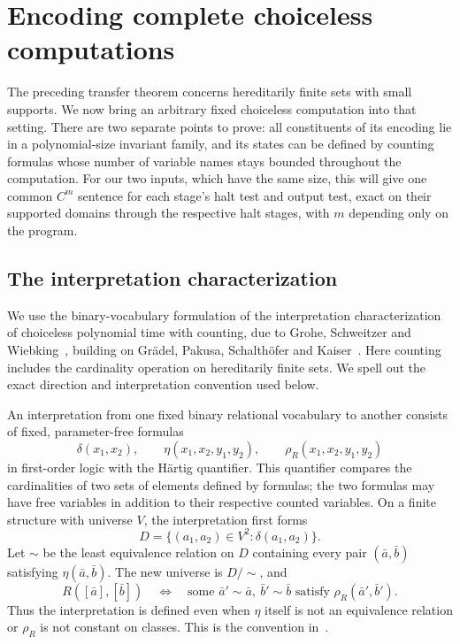 \section{Encoding complete choiceless computations}
\label{sec:coding}

The preceding transfer theorem concerns hereditarily finite sets with small
supports. We now bring an arbitrary fixed choiceless computation into that
setting. There are two separate points to prove: all constituents of its
encoding lie in a polynomial-size invariant family, and its states can be
defined by counting formulas whose number of variable names stays bounded
throughout the computation. For our two inputs, which have the same size,
this will give one common $C^m$ sentence for each stage's halt test and output test, exact
on their supported domains through the respective halt stages, with $m$
depending only on the program.

\subsection{The interpretation characterization}

We use the binary-vocabulary formulation of the interpretation characterization
of choiceless polynomial time with counting, due to Grohe, Schweitzer and
Wiebking~\cite[Section~6 and Theorem~18, arXiv version~1]{gsw2020}, building on
Gr\"adel, Pakusa, Schalth\"ofer and Kaiser~\cite[Theorem~1]{gkps2015}.
Here counting includes the cardinality operation on hereditarily finite sets.
We spell out the exact direction and interpretation convention used below.

An interpretation from one fixed binary relational vocabulary to another
consists of fixed, parameter-free formulas
\[
 \delta(x_1,x_2),\qquad
 \eta(x_1,x_2,y_1,y_2),\qquad
 \rho_R(x_1,x_2,y_1,y_2)
\]
in first-order logic with the H\"artig quantifier. This quantifier compares
the cardinalities of two sets of elements defined by formulas; the two
formulas may have free variables in addition to their respective counted
variables. On a finite structure with universe $V$, the interpretation first
forms
\[
 D=\{(a_1,a_2)\in V^2:\delta(a_1,a_2)\}.
\]
Let $\sim$ be the least equivalence relation on $D$ containing every pair
$(\bar a,\bar b)$ satisfying $\eta(\bar a,\bar b)$. The new universe is
$D/{\sim}$, and
\[
 R([\bar a],[\bar b])
 \quad\Longleftrightarrow\quad
 \text{some }\bar a'\sim\bar a,\ \bar b'\sim\bar b
 \text{ satisfy }\rho_R(\bar a',\bar b').
\]
Thus the interpretation is defined even when $\eta$ itself is not an
equivalence relation or $\rho_R$ is not constant on classes. This is the
convention in~\cite{gsw2020}.

